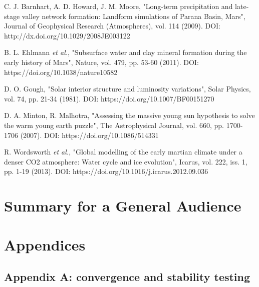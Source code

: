 \documentclass[12pt,onecolumn]{revtex4-2}    %
\begin{document}
\begin{thebibliography}{}
 C. J. Barnhart, A. D. Howard, J. M. Moore, "Long-term precipitation and late-stage valley network formation: Landform simulations of Parana Basin, Mars", Journal of Geophysical Research (Atmospheres), vol. 114 (2009). DOI: http://dx.doi.org/10.1029/2008JE003122

 B. L. Ehlmann \textit{et al.}, "Subsurface water and clay mineral formation during the early history of Mars", Nature, vol. 479, pp. 53-60 (2011). DOI: https://doi.org/10.1038/nature10582

 D. O. Gough, "Solar interior structure and luminosity variations", Solar Physics, vol. 74, pp. 21-34 (1981). DOI: 
https://doi.org/10.1007/BF00151270

 D. A. Minton, R. Malhotra, "Assessing the massive young sun hypothesis to solve the warm young earth puzzle", The Astrophysical Journal, vol. 660, pp. 1700-1706 (2007). DOI: https://doi.org/10.1086/514331

 R. Wordsworth \textit{et al.}, "Global modelling of the early martian climate under a denser CO2 atmosphere: Water cycle and ice evolution", Icarus, vol. 222, iss. 1, pp. 1-19 (2013). DOI: https://doi.org/10.1016/j.icarus.2012.09.036

\end{thebibliography} 

\newpage
 
\section{Summary for a General Audience}
\clearpage

\newpage

\section{Appendices}
\subsection{Appendix A: convergence and stability testing}
\end{document}
